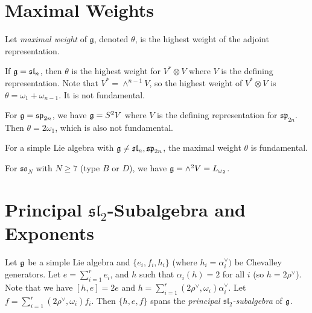 \section{Maximal Weights}

\begin{definition}
  Let \emph{maximal weight} of
  $\mathfrak{g}$, denoted $\theta$, is
  the highest weight of the
  adjoint representation.
\end{definition}

\begin{example}
  If $\mathfrak{g} = \mathfrak{sl}_n$,
  then $\theta$ is the highest
  weight for $V^* \otimes V$
  where $V$ is the defining representation.
  Note that $V^* = \wedge^{n - 1} V$,
  so the highest weight of
  $V^* \otimes V$ is
  $\theta = \omega_1 + \omega_{n - 1}$.
  It is not fundamental.
\end{example}

\begin{example}
  For $\mathfrak{g} = \mathfrak{sp}_{2n}$, we
  have $\mathfrak{g} = S^2 V$ where $V$ is
  the defining representation for
  $\mathfrak{sp}_{2n}$. Then
  $\theta = 2 \omega_1$, which is
  also not fundamental.
\end{example}

\begin{prop}
  For a simple Lie algebra with
  $\mathfrak{g} \ne \mathfrak{sl}_n, \mathfrak{sp}_{2n}$,
  the maximal weight $\theta$ is
  fundamental.
\end{prop}

\begin{example}
  For $\mathfrak{so}_N$ with $N \ge 7$
  (type $B$ or $D$), we have
  $\mathfrak{g} = \wedge^2 V = L_{\omega_2}$.
\end{example}

\section{Principal \texorpdfstring{$\mathfrak{sl}_2$}{sl2}-Subalgebra and Exponents}

\begin{definition}
  Let $\mathfrak{g}$ be a simple Lie algebra
  and $\{e_i, f_i, h_i\}$ (where
  $h_i = \alpha_i^\vee)$ be Chevalley
  generators. Let $e = \sum_{i = 1}^r e_i$,
  and $h$ such that $\alpha_i(h) = 2$
  for all $i$ (so $h = 2 \rho^\vee$).
  Note that we have $[h, e] = 2e$ and
  $h = \sum_{i = 1}^r (2 \rho^\vee, \omega_i) \alpha_i^\vee$.
  Let $f = \sum_{i = 1}^r (2 \rho^\vee, \omega_i) f_i$.
  Then $\{h, e, f\}$ spans the
  \emph{principal $\mathfrak{sl}_2$-subalgebra}
  of $\mathfrak{g}$.
\end{definition}


